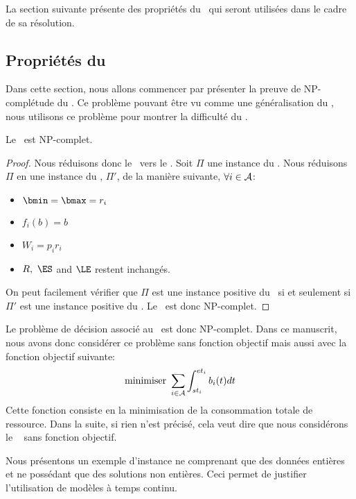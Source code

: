 La section suivante présente des propriétés du \CECSP~qui seront 
utilisées dans le cadre de sa résolution. 

\subsection{Propriétés du \CECSP}
\label{sec:ppte_CECSP}
Dans cette section, nous allons commencer par présenter la preuve de
NP-complétude du \CECSP. Ce problème pouvant être vu comme une
généralisation du \CUSP, nous utilisons ce problème pour montrer la
difficulté du \CECSP. 

\begin{theo}
Le \CECSP~est NP-complet.
\end{theo}

\begin{proof}
Nous réduisons donc le \CUSP~vers le \CECSP. Soit $\Pi$ une instance
du \CUSP. Nous réduisons $\Pi$ en une instance du \CECSP, $\Pi'$, de
la manière suivante, $\forall i \in {\cal A}$:
\begin{itemize}
\item $ \bmin=\bmax=r_i$
\item $f_i(b)=b$
\item $W_i=p_ir_i$
\item $R,\ \ES$ and $\LE$ restent inchangés. 
\end{itemize}

On peut facilement vérifier  que $\Pi$ est une instance positive du \CUSP~si
et seulement si $\Pi'$ est une instance positive du \CECSP. Le
\CECSP~est donc NP-complet.
\end{proof}

Le problème de décision associé au \CECSP~est donc NP-complet. Dans ce
manuscrit, nous avons donc considérer ce problème sans fonction
objectif mais aussi avec la fonction objectif suivante: 
\[\text{minimiser } \sum_{i \in {\cal A}} \int_{st_i}^{et_i} b_i(t)dt\]
Cette fonction consiste en la minimisation de la consommation totale
de ressource. Dans la suite, si rien n'est précisé, cela veut dire que
nous considérons le \CECSP~ sans fonction objectif.

Nous présentons un exemple d'instance ne comprenant que des données
entières et ne possédant que des solutions non entières. Ceci permet
de justifier l'utilisation de modèles à temps continu.

